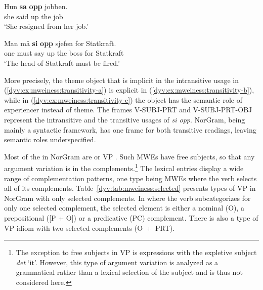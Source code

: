 \documentclass[output=paper]{langsci/langscibook}
\begin{document}
\ea \label{dyv:ex:mweiness:transitivity-b} \gll Hun \textbf{sa} \textbf{opp} jobben. \\
     she said up {the job} \\
\glt `She resigned from her job.' \\
\z

\ea \label{dyv:ex:mweiness:transitivity-c} \gll Man må \textbf{si} \textbf{opp} sjefen for Statkraft. \\
      one must say up {the boss} for Statkraft \\
\glt `The head of Statkraft must be fired.' 
\z

More precisely, the theme object that is implicit in the intransitive usage in (\ref{dyv:ex:mweiness:transitivity-a}) is explicit in (\ref{dyv:ex:mweiness:transitivity-b}), while in (\ref{dyv:ex:mweiness:transitivity-c}) the object has the semantic role of experiencer instead of theme.
The frames V-SUBJ-PRT and V-SUBJ-PRT-OBJ represent the intransitive and the transitive usages of \emph{si opp}.
NorGram, being mainly a syntactic framework, has one frame for both transitive readings, leaving semantic roles underspecified. 

Most of the  in NorGram are  or VP .
Such MWEs have free subjects, so that any argument variation is in the complements.\footnote{The exception to free subjects in VP  is expressions with the expletive subject \emph{det} `it'. However, this type of argument variation is analyzed as a grammatical rather than a lexical selection of the subject and is thus not considered here.}
The lexical entries display a wide range of complementation patterns, one type being MWEs where the verb selects all of its complements. 
Table~\ref{dyv:tab:mweiness:selected} presents types of VP  in NorGram with only selected complements. 
In  where the verb subcategorizes for only one selected complement, the selected element is either a nominal (O), a prepositional ([P + O]) or a predicative (PC) complement. 
There is also a type of VP idiom with two selected complements (O~+~PRT).
\end{document}
